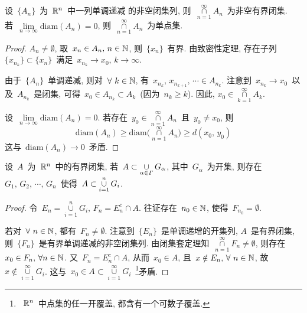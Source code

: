 \begin{theorem}
设~$\{A_n\}$~为~$\mathbb{R}^n$~中一列单调递减
的非空闭集列, 则~$\mathop{\cap}\limits_{n=1}^\infty A_n$~为非空有界闭集. 若~$\lim\limits_{n \to \infty} \mathrm{diam}(A_n) = 0$, 则~$\mathop{\cap}\limits_{n=1}^\infty A_n$~为单点集.
\end{theorem}

\begin{proof}
$A_n \neq \emptyset$, 取~$x_n \in A_n,\, n \in \mathbb{N}$, 则~$\{x_n\}$~有界. 由致密性定理, 存在子列~$\{x_{n_k}\} \subset \{x_n\}$~满足~$x_{n_k} \rightarrow x_0, \, k \to \infty$.

由于~$\{A_n\}$~单调递减, 则对~$\forall~k \in \mathbb{N}$, 有~$x_{n_k},\,x_{n_{k+1}},\,\cdots \in A_{n_k}$. 注意到~$x_{n_k} \rightarrow x_0$~以及~$A_{n_k}$~是闭集, 可得~$x_0 \in A_{n_k} \subset A_k$~(因为~$n_k \geqslant k$). 因此, $x_0 \in \mathop{\cap}\limits_{k=1}^\infty A_k$.

设~$\lim\limits_{n \to \infty} \mathrm{diam}(A_n) = 0$. 若存在~$y_0 \in \mathop{\cap}\limits_{n=1}^\infty A_n$~且~$y_0 \neq x_0$, 则
\[
\mathrm{diam}(A_n) \geqslant \mathrm{diam}\Big({\textstyle \mathop{\cap}\limits_{n=1}^\infty A_n}\Big) \geqslant d(x_0,\,y_0)
\]
这与~$\mathrm{diam}(A_n) \rightarrow 0$~矛盾.
\end{proof}

\begin{theorem} \label{thm1.4.7}
设~$A$~为~$\mathbb{R}^n$~中的有界闭集,
若~$A \subset \mathop{\cup}\limits_{\alpha \in \mathnormal{\Gamma}} G_\alpha$, 其中~$G_\alpha$~为开集, 则存在~$G_1,\,G_2,\,\cdots,\,G_n$~使得~$A \subset \mathop{\cup}\limits_{i=1}^n G_i$.
\end{theorem}

\begin{proof}
令~$E_n = \mathop{\cup}\limits_{i=1}^n G_i, \, F_n = E_n ^c \cap A$. 往证存在~$n_0 \in \mathbb{N}$, 使得~$F_{n_0} = \emptyset$.

若对~$\forall~n \in \mathbb{N}$, 都有~$F_n \neq \emptyset$. 注意到~$\{E_n\}$~是单调递增的开集列, $A$~是有界闭集, 则~$\{F_n\}$~是有界单调递减的非空闭集列. 由闭集套定理知~$\mathop{\cap}\limits_{n=1}^\infty F_n \neq \emptyset$, 则存在~$x_0 \in F_n, \, \forall n \in \mathbb{N}$. 又~$F_n = E_n ^c \cap A$, 从而~$x_0 \in A$, 且~$x \notin E_n, \, \forall~n \in \mathbb{N}$, 故~$x \notin \mathop{\cup}\limits_{i=1}^\infty G_i$. 这与~$x_0 \in A \subset \mathop{\cup}\limits_{i=1}^\infty G_i$~\footnote{~$\mathbb{R}^n$~中点集的任一开覆盖, 都含有一个可数子覆盖. }矛盾.
\end{proof}

